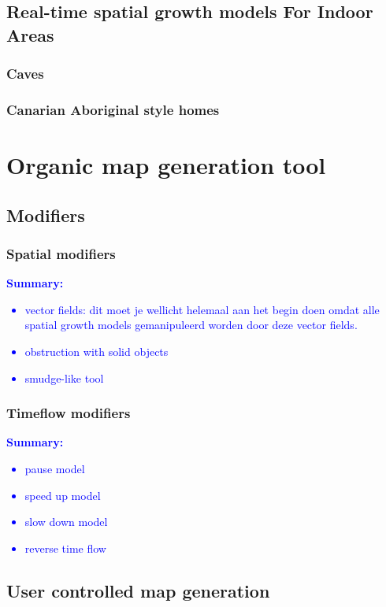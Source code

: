 \documentclass{article}
\newcommand{\inhoud}[1]{\textcolor{blue}{\textbf{Summary: }\it{#1}}}
\begin{document}
\subsection{Real-time spatial growth models For Indoor Areas}

\subsubsection{Caves}

\subsubsection{Canarian Aboriginal style homes}

\section{Organic map generation tool}

\subsection{Modifiers}

\subsubsection{Spatial modifiers}

\inhoud{
\begin{itemize}
\item vector fields: dit moet je wellicht helemaal aan het begin doen omdat alle spatial growth models
gemanipuleerd worden door deze vector fields.
\item obstruction with solid objects
\item smudge-like tool
\end{itemize}
}

\subsubsection{Timeflow modifiers}
\inhoud{
\begin{itemize}
\item pause model
\item speed up model
\item slow down model
\item reverse time flow
\end{itemize}
}


\subsection{User controlled map generation}
\end{document}
